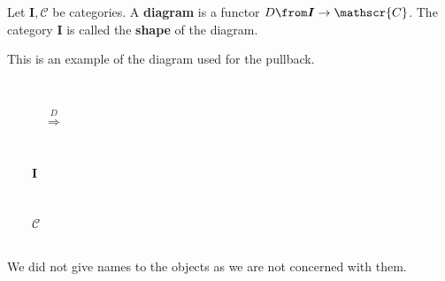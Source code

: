 \begin{definition}
  Let $\bm{I}, \mathscr{C}$ be categories.
  A \textbf{diagram} is a functor $D \from \bm{I} \to \mathscr{C}$.
  The category $\bm{I}$ is called the \textbf{shape} of the diagram.
\end{definition}
\begin{example}
  \label{diagramexample}
  This is an example of the diagram used for the pullback. \\[1cm]
  \begin{minipage}{0.3\linewidth}
    \hspace{2cm}
    \\
  \end{minipage}%
  \begin{minipage}{0.2\linewidth}
    $\qquad\quad\overset{D}{\Longrightarrow}$
  \end{minipage}%
  \begin{minipage}{0.1\linewidth}
  \end{minipage}\\[2em]
  \begin{minipage}{0.3\linewidth}
    \hspace{2cm}
    $\qquad \bm I$
  \end{minipage}%
  \begin{minipage}{0.2\linewidth}
    \
  \end{minipage}%
  \begin{minipage}{0.3\linewidth}
    \hspace{2cm}
    $\qquad \mathscr C$
  \end{minipage}\\[1em]
  We did not give names to the objects as we are not concerned with them.
\end{example}

